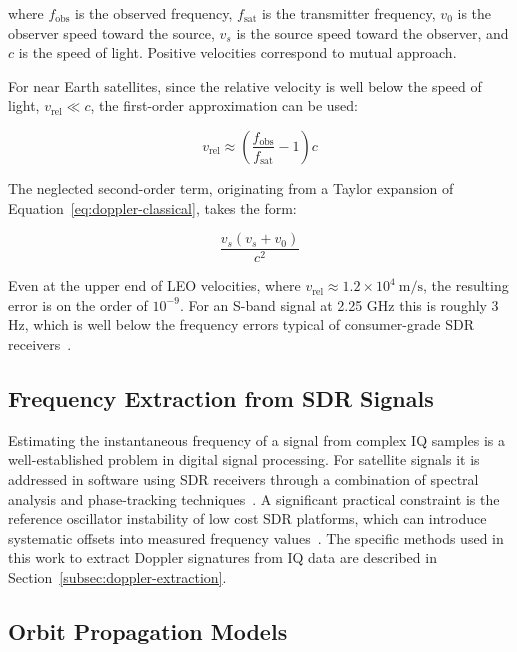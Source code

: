 \documentclass[lineno,pdflatex,sn-basic,referee,]{sn-jnl}
\begin{document}
\noindent
where $f_{\mathrm{obs}}$ is the observed frequency, $f_{\mathrm{sat}}$ is the transmitter frequency, $v_0$ is the observer speed toward the source, $v_s$ is the source speed toward the observer, and $c$ is the speed of light. Positive velocities correspond to mutual approach.

For near Earth satellites, since the relative velocity is well below the speed of light, $v_{\mathrm{rel}} \ll c$, the first-order approximation can be used:

\begin{equation}
    v_{\mathrm{rel}} \approx \left(\frac{f_{\mathrm{obs}}}{f_{\mathrm{sat}}} - 1\right)c
    \label{eq:first-order-approx}
\end{equation}

\noindent
The neglected second-order term, originating from a Taylor expansion of Equation~\ref{eq:doppler-classical}, takes the form:

\begin{equation}
    \frac{v_s(v_s + v_0)}{c^2}
    \label{eq:second-order-term}
\end{equation}

Even at the upper end of LEO velocities, where $v_{\mathrm{rel}} \approx 1.2 \times 10^{4}\ \mathrm{m/s}$, the resulting error is on the order of $10^{-9}$. For an S-band signal at 2.25 GHz this is roughly 3 Hz, which is well below the frequency errors typical of consumer-grade SDR receivers~\citep{bednarz2024}.

\subsection{Frequency Extraction from SDR Signals}
\label{subsec:freq-extraction}

Estimating the instantaneous frequency of a signal from complex IQ samples is a well-established problem in digital signal processing. For satellite signals it is addressed in software using SDR receivers through a combination of spectral analysis and phase-tracking techniques~\citep{guo2015, gao2016}. A significant practical constraint is the reference oscillator instability of low cost SDR platforms, which can introduce systematic offsets into measured frequency values~\citep{bednarz2024}. The specific methods used in this work to extract Doppler signatures from IQ data are described in Section~\ref{subsec:doppler-extraction}.

\subsection{Orbit Propagation Models}
\label{subsec:orbit-models}
\end{document}
